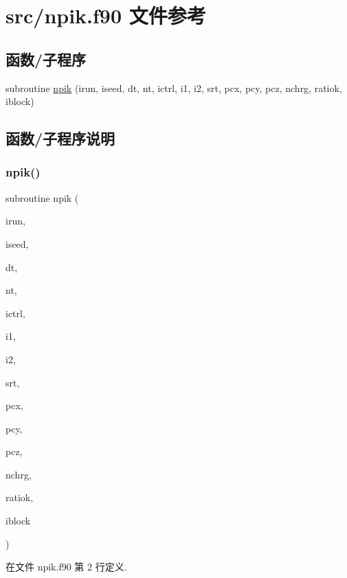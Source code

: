 \hypertarget{npik_8f90}{}\section{src/npik.f90 文件参考}
\label{npik_8f90}
\subsection*{函数/子程序}
\begin{DoxyCompactItemize}
\item 
subroutine \mbox{\hyperlink{npik_8f90_af82cf952da4a981ac64b0998ef1aa8ae}{npik}} (irun, iseed, dt, nt, ictrl, i1, i2, srt, pcx, pcy, pcz, nchrg, ratiok, iblock)
\end{DoxyCompactItemize}


\subsection{函数/子程序说明}
\mbox{\label{npik_8f90_af82cf952da4a981ac64b0998ef1aa8ae}} 
\subsubsection{\texorpdfstring{npik()}{npik()}}
{\footnotesize\ttfamily subroutine npik (\begin{DoxyParamCaption}\item[{}]{irun,  }\item[{}]{iseed,  }\item[{}]{dt,  }\item[{}]{nt,  }\item[{}]{ictrl,  }\item[{}]{i1,  }\item[{}]{i2,  }\item[{}]{srt,  }\item[{}]{pcx,  }\item[{}]{pcy,  }\item[{}]{pcz,  }\item[{}]{nchrg,  }\item[{}]{ratiok,  }\item[{}]{iblock }\end{DoxyParamCaption})}



在文件 npik.\+f90 第 2 行定义.

